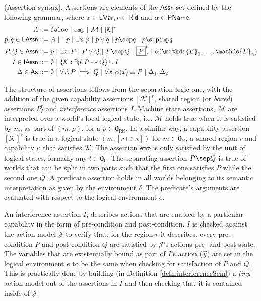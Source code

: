 \begin{defn}
	(Assertion syntax).
	Assertions are elements of the $\mathsf{Assn}$ set defined by the following grammar, where $x \in \mathsf{LVar}, r \in \mathsf{Rid}$ and $\alpha \in \mathsf{PName}$. 
	\begin{align*}
		A &::= \mathtt{false}\ |\ \mathtt{emp}\ |\ \mathcal{M}\ |\ [\mathcal{K}]^r \\
		p, q \in \mathsf{LAssn} &::= A\ |\ \lnot p\ |\ \exists x \ldotp p\ |\ p \lor q\ |\ p \sep q\ |\ p \sepimp q \\
		P, Q \in \mathsf{Assn} &::= p\ |\ \exists x \ldotp P\ |\ P \lor Q\ |\ P \sep Q\ |\ \boxed{P}_I^r\ |\ \alpha(\mathds{E}_1, \ldots, \mathds{E}_n) \\
		I \in \mathsf{IAssn} &::= \emptyset\ |\ \{ \mathcal{K} : \exists \vec{y} \ldotp P \leadsto Q \} \cup I \\
		\Delta \in \mathsf{Ax} &::= \emptyset\ |\ \forall \vec{x} \ldotp P \implies Q\ |\ \forall \vec{x} \ldotp \alpha(\vec{x}) \equiv P\ |\ \Delta_1, \Delta_2
	\end{align*}
\end{defn}

The structure of assertions follows from the separation logic one, with the addition of the given capability assertions $[\mathcal{K}]^r$, shared region (or \textit{boxed}) assertions $\boxed{P}^r_I$ and \textit{interference} assertions $I$. Machine state assertions, $\mathcal{M}$ are interpreted over a world's local logical state, i.e. $\mathcal{M}$ holds true when it is satisfied by $m$, as part of $(m, \rho)$, for a $\rho \in \mathbf{0}_\mathsf{RK}$. In a similar way, a capability assertion $[\mathcal{K}]^r$ is true in a logical state $(m, [r \mapsto \kappa])$ for $m \in\mathbf{0}_\mathbb{M}$, a shared region $r$ and capability $\kappa$ that satisfies $\mathcal{K}$. The assertion $\mathtt{emp}$ is only satisfied by the unit of logical states, formally any $l \in \mathbf{0}_\mathsf{L}$. The separating assertion $P \sep Q$ is true of worlds that can be split in two parts such that the first one satisfies $P$ while the second one $Q$. A predicate assertion holds in all worlds belonging to its semantic interpretation as given by the environment $\delta$. The predicate's arguments are evaluated with respect to the logical environment $e$.

An interference assertion $I$, describes actions that are enabled by a particular capability in the form of pre-condition and post-condition. $I$ is checked against the action model $\mathcal{J}$ to verify that, for the region $r$ it describes, every pre-condition $P$ and post-condition $Q$ are satisfied by $\mathcal{J}$'s actions pre- and post-state. The variables that are existentially bound as part of $I$'s action ($\vec{y}$) are set in the logical environment $e$ to be the same when checking for satisfaction of $P$ and $Q$. This is practically done by building (in Definition \ref{defn:interferenceSem}) a \textit{tiny} action model out of the assertions in $I$ and then checking that it is contained inside of $\mathcal{J}$.

